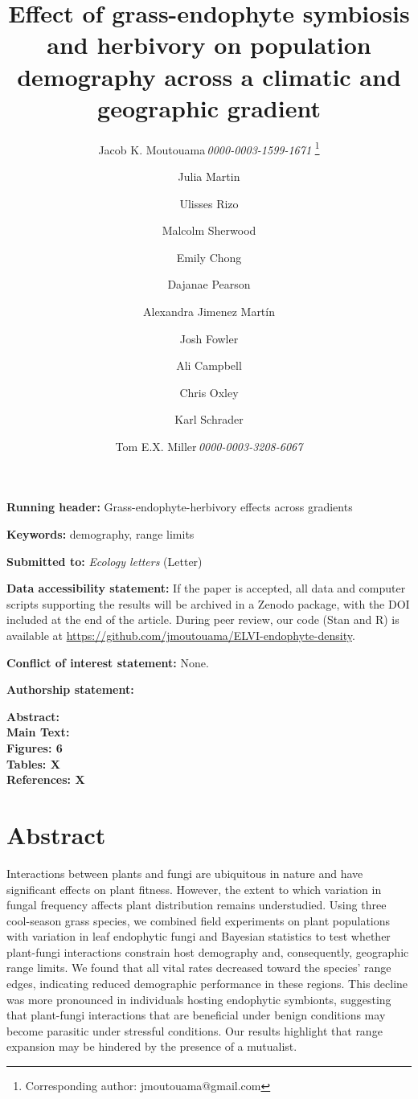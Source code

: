 \documentclass[12pt]{article}\usepackage[]{graphicx}\usepackage[dvipsnames]{xcolor}
\title{Effect of grass-endophyte symbiosis and herbivory on population demography across a climatic and geographic gradient}
\author[1]{Jacob K. Moutouama\,\textit{0000-0003-1599-1671} \thanks{Corresponding author: jmoutouama@gmail.com}}
\author[1]{Julia Martin}
\author[1]{Ulisses Rizo}
\author[1]{Malcolm Sherwood}
\author[1]{Emily Chong}
\author[1]{Dajanae Pearson}
\author[1]{Alexandra Jimenez Martín}
\author[2]{Josh Fowler}
\author[1]{Ali Campbell}
\author[1]{Chris Oxley}
\author[1]{Karl Schrader}
\author[1]{Tom E.X. Miller\,\textit{0000-0003-3208-6067}}
\affil[1]{Program in Ecology and Evolutionary Biology, Department of BioSciences, Rice University, Houston, TX USA}
\affil[2]{University of Miami, Department of Biology, Miami, FL USA}
\date{} %
\begin{document}
\renewcommand{\baselinestretch}{1.2}
\maketitle
\noindent\textbf{Running header:} Grass-endophyte-herbivory effects across gradients
\bigskip 

\noindent\textbf{Keywords:} demography, range limits

\bigskip 
\noindent\textbf{Submitted to:} \textit{Ecology letters} (Letter)

\bigskip 
\noindent\textbf{Data accessibility statement:} 
If the paper is accepted, all data and computer scripts supporting the results will be archived in a Zenodo package, with the DOI included at the end of the article. 
During peer review, our code (Stan and R) is available at \url{https://github.com/jmoutouama/ELVI-endophyte-density}. 

\bigskip 
\noindent\textbf{Conflict of interest statement:} None.

\bigskip
\noindent\textbf{Authorship statement:}

\bigskip
\noindent\textbf{Abstract:}\\
\noindent\textbf{Main Text:}\\
\noindent\textbf{Figures: 6}\\
\noindent\textbf{Tables: X}\\
\noindent\textbf{References: X}

\newpage
\linenumbers
\section*{Abstract}
Interactions between plants and fungi are ubiquitous in nature and have significant effects on plant fitness.
However, the extent to which variation in fungal frequency affects plant distribution remains understudied. 
Using three cool-season grass species, we combined field experiments on plant populations with variation in leaf endophytic fungi and Bayesian statistics to test whether plant-fungi interactions constrain host demography and, consequently, geographic range limits. 
We found that all vital rates decreased toward the species' range edges, indicating reduced demographic performance in these regions. 
This decline was more pronounced in individuals hosting endophytic symbionts, suggesting that plant-fungi interactions that are beneficial under benign conditions may become parasitic under stressful conditions.
Our results highlight that range expansion may be hindered by the presence of a mutualist.
\end{document}
